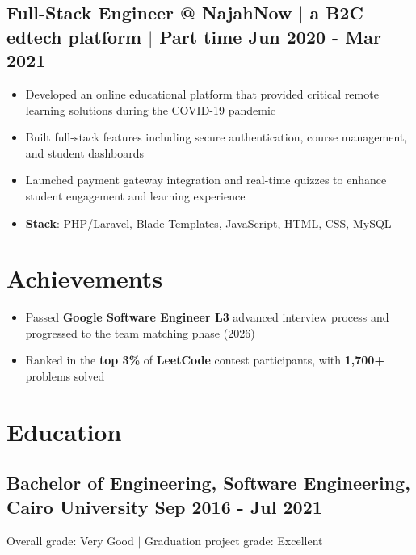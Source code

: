 \documentclass[a4paper,10pt]{article}
\newenvironment{zitemize}{
\begin{itemize}\itemsep0pt \parskip0pt \parsep1pt}
{\end{itemize}\vspace{-0.5cm}}
\begin{document}
\subsection*{Full-Stack Engineer @ NajahNow $|$ a B2C edtech platform $|$ Part time \hfill Jun 2020 - Mar 2021}
    \begin{zitemize}
        \item Developed an online educational platform that provided critical remote learning solutions during the COVID-19 pandemic
        \item Built full-stack features including secure authentication, course management, and student dashboards
        \item Launched payment gateway integration and real-time quizzes to enhance student engagement and learning experience
        \item \textbf{Stack}: PHP/Laravel, Blade Templates, JavaScript, HTML, CSS, MySQL
    \end{zitemize}

\section{Achievements}
\begin{zitemize}
    \item Passed \textbf{Google Software Engineer L3} advanced interview process and progressed to the team matching phase (2026)
    \item Ranked in the \textbf{top 3\%} of \textbf{LeetCode} contest participants, with \textbf{1,700+} problems solved
\end{zitemize}


\section{Education}
\subsection*{Bachelor of Engineering, Software Engineering, {\normalsize \normalfont Cairo University} \hfill Sep 2016 - Jul 2021}
\vspace{0.05cm}
Overall grade: Very Good $|$ Graduation project grade: Excellent
\end{document}
